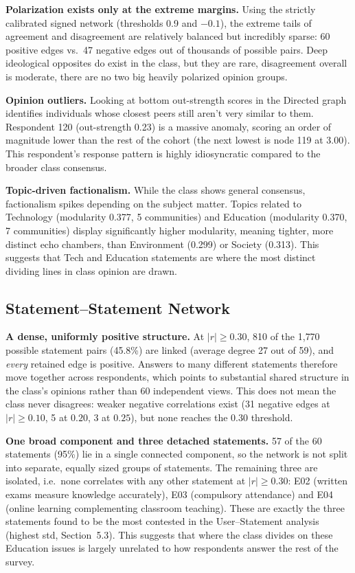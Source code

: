 \documentclass[11pt]{article}
\begin{document}
\textbf{Polarization exists only at the extreme margins.} Using the strictly calibrated
signed network (thresholds 0.9 and $-0.1$), the extreme tails of agreement and
disagreement are relatively balanced but incredibly sparse: 60 positive edges vs.\ 47
negative edges out of thousands of possible pairs. Deep ideological opposites do exist
in the class, but they are rare, disagreement overall is moderate, there are no two big heavily polarized opinion groups.

\textbf{Opinion outliers.} Looking at bottom out-strength scores in the Directed graph
identifies individuals whose closest peers still aren't very
similar to them. Respondent 120 (out-strength 0.23) is a massive anomaly, scoring an
order of magnitude lower than the rest of the cohort (the next lowest is node 119 at
3.00). This respondent's response pattern is highly idiosyncratic compared to the
broader class consensus.

\textbf{Topic-driven factionalism.} While the class shows general consensus,
factionalism spikes depending on the subject matter. Topics related to Technology
(modularity 0.377, 5 communities) and Education (modularity 0.370, 7 communities)
display significantly higher modularity, meaning tighter, more distinct echo chambers,
than Environment (0.299) or Society (0.313). This suggests that Tech and Education
statements are where the most distinct dividing lines in class opinion are drawn.

\subsection{Statement--Statement Network}

\textbf{A dense, uniformly positive structure.} At $|r| \geq 0.30$, 810 of the 1{,}770
possible statement pairs (45.8\%) are linked (average degree 27 out of 59), and \emph{every}
retained edge is positive. Answers to many different statements therefore move together across
respondents, which points to substantial shared structure in the class's opinions rather than
60 independent views. This does not mean the class never disagrees: weaker negative
correlations exist (31 negative edges at $|r| \geq 0.10$, 5 at $0.20$, 3 at $0.25$), but none
reaches the 0.30 threshold.

\textbf{One broad component and three detached statements.} 57 of the 60 statements (95\%)
lie in a single connected component, so the network is not split into separate, equally sized
groups of statements. The remaining three are isolated, i.e.\ none correlates with any other
statement at $|r| \geq 0.30$: E02 (written exams measure knowledge accurately), E03
(compulsory attendance) and E04 (online learning complementing classroom teaching). These are
exactly the three statements found to be the most contested in the User--Statement analysis
(highest std, Section~5.3). This suggests that where the class divides on these Education
issues is largely unrelated to how respondents answer the rest of the survey.
\end{document}
